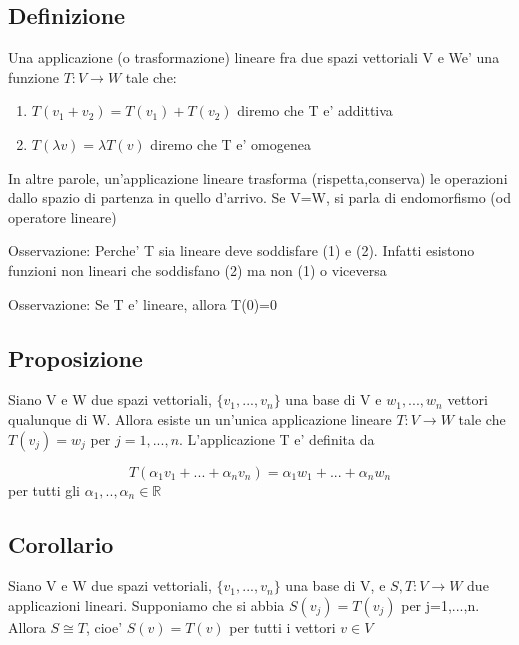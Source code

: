 \documentclass{article}
\begin{document}
\subsection{Definizione}
\begin{flushleft}
	Una applicazione (o trasformazione) lineare fra due spazi vettoriali V e We' una funzione
	$T: V \to W$ tale che:
\end{flushleft}
\begin{enumerate}
	\item $T(v_1+v_2)=T(v_1)+T(v_2)$ diremo che T e' addittiva
	\item $T(\lambda v)=\lambda T(v)$ diremo che T e' omogenea
\end{enumerate}
\begin{flushleft}
	In altre parole, un'applicazione lineare trasforma (rispetta,conserva) le operazioni dallo spazio di partenza
	in quello d'arrivo. Se V=W, si parla di endomorfismo (od operatore lineare)
\end{flushleft}
\begin{flushleft}
	Osservazione: Perche' T sia lineare deve soddisfare (1) e (2). Infatti esistono funzioni non lineari che soddisfano (2) ma non (1)
	o viceversa
\end{flushleft}
\begin{flushleft}
	Osservazione: Se T e' lineare, allora T(0)=0
\end{flushleft}
\subsection{Proposizione}
\begin{flushleft}
	Siano V e W due spazi vettoriali, $\{v_1,...,v_n \}$ una base di V e $w_1,...,w_n$ vettori qualunque di W.
	Allora esiste un un'unica applicazione lineare $T: V \to W$ tale che $T(v_j)=w_j$ per $j=1,...,n$. L'applicazione T e' definita da
\end{flushleft}
\begin{equation*}
	T(\alpha_1 v_1+...+\alpha_n v_n)=\alpha_1 w_1+...+\alpha_n w_n
\end{equation*}
per tutti gli $\alpha_1,..,\alpha_n \in \mathbb{R}$
\subsection{Corollario}
\begin{flushleft}
	Siano V e W due spazi vettoriali, $\{ v_1,...,v_n \}$ una base di V, e $S,T:V\to W$ due applicazioni lineari.
	Supponiamo che si abbia $S(v_j)=T(v_j)$ per j=1,...,n. Allora $S \cong T$, cioe' $S(v)=T(v)$ per tutti i vettori $v \in V$
\end{flushleft}
\end{document}
